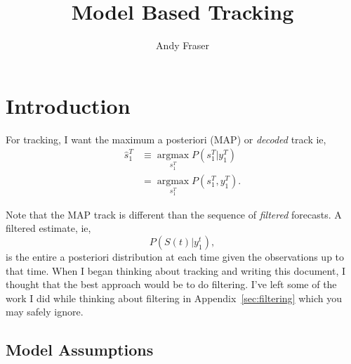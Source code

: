 \documentclass[12pt]{article}
\title{Model Based Tracking}
\author{Andy Fraser}
\newcommand{\ts}[4]{{#1}_{#3}^{#4}} %
\newcommand{\argmax}{\operatorname*{argmax}}
\begin{document}
\maketitle

\section*{Introduction}
\label{sec:introduction}

For tracking, I want the maximum a posteriori (MAP) or \emph{decoded}
track ie,
\begin{align*}
  \ts{\hat s}{\tau}{1}{T} &\equiv \argmax_{\ts{s}{\tau}{1}{T}}
  P(\ts{s}{\tau}{1}{T}|\ts{y}{\tau}{1}{T}) \\
  &= \argmax_{\ts{s}{\tau}{1}{T}} P(\ts{s}{\tau}{1}{T},\ts{y}{\tau}{1}{T}).
\end{align*}

Note that the MAP track is different than the sequence of
\emph{filtered} forecasts.  A filtered estimate, ie,
\begin{equation*}
  P(S(t)|\ts{y}{\tau}{1}{t}),
\end{equation*}
is the entire a posteriori distribution at each time given the
observations up to that time.  When I began thinking about tracking
and writing this document, I thought that the best approach would be
to do filtering.  I've left some of the work I did while thinking
about filtering in Appendix~\ref{sec:filtering} which you may safely
ignore.

\subsection*{Model Assumptions}
\label{sec:model-assumptions}
\end{document}
